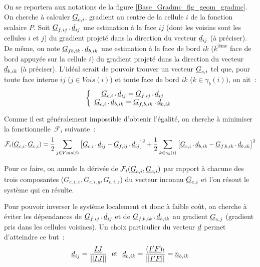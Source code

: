 On se reportera aux notations de la figure \ref{Base_Gradmc_fig_geom_gradmc}. 
On cherche \`a calculer $\underline{G}_{c,i}$, gradient au centre de la cellule $i$ de la
fonction scalaire $P$. Soit  $\underline{G}_{f,ij}\,.\,\underline{d}_{ij}$ une estimation
\`a la face $ij$ (dont les voisins sont les cellules $i$ et $j$) 
du gradient projet\'e dans la direction du vecteur $\underline{d}_{ij}$ (\`a pr\'eciser). 
De m\^eme, on note 
$\underline{G}_{fb,ik}\,.\,\underline{d}_{b,ik}$ une estimation  \`a la face de bord $ik$
($k^{\text{i\`eme}}$ face de bord appuy\'ee sur la cellule $i$) du gradient projet\'e dans
la direction du vecteur $\underline{d}_{b,ik}$ (\`a pr\'eciser). 
L'id\'eal serait de pouvoir trouver un vecteur $\underline{G}_{c,i}$ tel que, pour toute
face interne $ij$ ($j\in Vois(i)$) et toute face de bord $ik$
($k\in\gamma_b(i))$, on ait~:
\begin{equation}
\left\{\begin{array}{c}
\underline{G}_{c,i}\,.\,\underline{d}_{ij}=\underline{G}_{f,ij}\,.\,\underline{d}_{ij}\\
\underline{G}_{c,i}\,.\,\underline{d}_{b,ik}=\underline{G}_{f,b,ik}\,.\,\underline{d}_{b,ik}
\end{array}\right.
\end{equation}




Comme il est g\'en\'eralement impossible d'obtenir l'\'egalit\'e, on cherche 
\`a minimiser la fonctionnelle~$\mathcal{F}_i$ suivante~:
\begin{equation}\label{Base_Gradmc_eq_fonctionnelle_gradmc}
\mathcal{F}_i(\underline{G}_{c,i},\underline{G}_{c,i})=
\frac{1}{2}\sum\limits_{j\in Vois(i)}\left[
\underline{G}_{c,i}\,.\,\underline{d}_{ij}-\underline{G}_{f,ij}\,.\,\underline{d}_{ij}
\right]^2+
\frac{1}{2}\sum\limits_{k\in \gamma_b(i)}\left[
\underline{G}_{c,i}\,.\,\underline{d}_{b,ik}-\underline{G}_{f,b,ik}\,.\,\underline{d}_{b,ik}
\right]^2
\end{equation}

Pour ce faire, on annule la d\'eriv\'ee de
$\mathcal{F}_i(\underline{G}_{c,i},\underline{G}_{c,i})$ 
par rapport \`a
chacune des trois composantes ($G_{c,i,x}, G_{c,i,y}, G_{c,i,z}$) du vecteur
inconnu $\underline{G}_{c,i}$ et l'on r\'esout le syst\`eme qui en r\'esulte.

Pour pouvoir inverser le syst\`eme localement et donc \`a faible co\^ut, on
cherche \`a \'eviter les d\'ependances de $\underline{G}_{f,ij}\,.\,\underline{d}_{ij}$ et 
de $\underline{G}_{f,b,ik}\,.\,\underline{d}_{b,ik}$ au gradient $\underline{G}_{c,j}$
(gradient pris dans les cellules voisines). Un choix particulier du vecteur
$\underline{d}$ permet d'atteindre ce but~:
\begin{equation}
\underline{d}_{ij} = \frac{\underline{IJ}}{||\underline{IJ}||} \text{\ \ et\ \ } \underline{d}_{b,ik} = \frac{(\underline{I'F})_l}{||\underline{I'F}||}=\underline{n}_{b,ik}
\end{equation}



